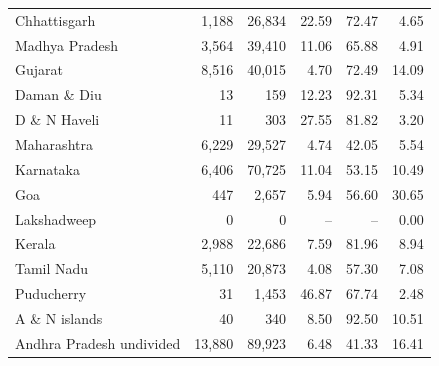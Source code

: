 \documentclass[11pt,a4paper]{report}
\begin{document}
\begin{longtable}{>{\raggedright\arraybackslash}p{5.0cm}rrrrr}
Chhattisgarh & 1,188 & 26,834 & 22.59 & 72.47 & 4.65 \\
Madhya Pradesh & 3,564 & 39,410 & 11.06 & 65.88 & 4.91 \\
Gujarat & 8,516 & 40,015 & 4.70 & 72.49 & 14.09 \\
Daman \& Diu & 13 & 159 & 12.23 & 92.31 & 5.34 \\
D \& N Haveli & 11 & 303 & 27.55 & 81.82 & 3.20 \\
Maharashtra & 6,229 & 29,527 & 4.74 & 42.05 & 5.54 \\
Karnataka & 6,406 & 70,725 & 11.04 & 53.15 & 10.49 \\
Goa & 447 & 2,657 & 5.94 & 56.60 & 30.65 \\
Lakshadweep & 0 & 0 & -- & -- & 0.00 \\
Kerala & 2,988 & 22,686 & 7.59 & 81.96 & 8.94 \\
Tamil Nadu & 5,110 & 20,873 & 4.08 & 57.30 & 7.08 \\
Puducherry & 31 & 1,453 & 46.87 & 67.74 & 2.48 \\
A \& N islands & 40 & 340 & 8.50 & 92.50 & 10.51 \\
Andhra Pradesh undivided & 13,880 & 89,923 & 6.48 & 41.33 & 16.41 \\
\end{longtable}\endgroup
\begingroup\footnotesize\setlength{\tabcolsep}{4pt}
\end{document}
